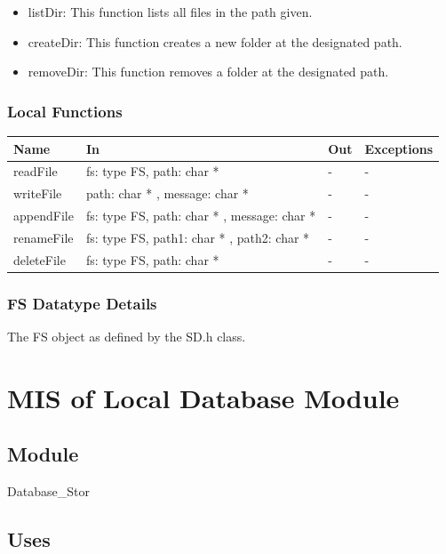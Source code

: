 \documentclass[12pt, titlepage]{article}
\begin{document}
\begin{itemize}
\item listDir: This function lists all files in the path given.
\item createDir: This function creates a new folder at the designated path.
\item removeDir: This function removes a folder at the designated path.
\end{itemize}

\subsubsection{Local Functions}

\begin{center}
\begin{tabular}{p{2cm} p{4cm} p{3.5cm} p{4cm}}
\hline
\textbf{Name} & \textbf{In} & \textbf{Out} & \textbf{Exceptions} \\
\hline
readFile & fs: type FS, path: char * & - & - \\
writeFile & path: char * , message: char *& - & - \\
appendFile & fs: type FS, path: char * , message: char * & - & - \\
renameFile & fs: type FS, path1: char * , path2: char * & - & -\\
deleteFile & fs: type FS, path: char * & - & - \\
\hline
\end{tabular}
\end{center}

\subsubsection{FS Datatype Details}
The FS object as defined by the SD.h class.

\newpage

\section{MIS of Local Database Module} \label{mDS_2} 

\subsection{Module}

Database\_Stor

\subsection{Uses}
\end{document}
